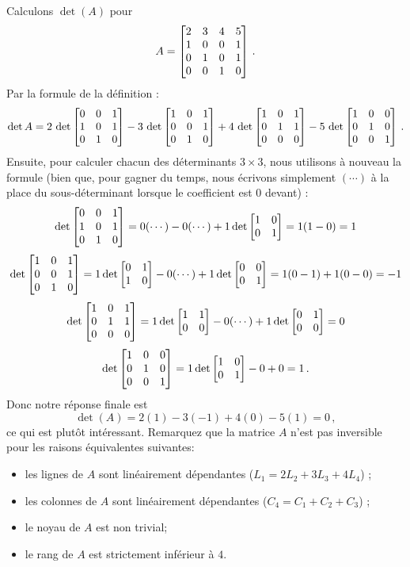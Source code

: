 \begin{myexample}
Calculons $\det(A)$ pour
$$
A= \left[ \begin{matrix} 
2 & 3 & 4 & 5 \\ 
1 & 0 & 0 & 1\\ 
0 & 1 & 0 & 1\\ 
0 & 0 & 1 & 0 \end{matrix} \right]\,.
$$
Par la formule de la définition :
$$
\det A = 2\,\det\left[ \begin{matrix} 0&0&1\\ 1&0&1\\ 0&1&0 \end{matrix} \right] - 3\,\det\left[ \begin{matrix} 1&0&1\\0&0&1\\0&1&0 \end{matrix} \right] +
4\,\det\left[ \begin{matrix} 1&0&1\\ 0&1&1\\ 0&0&0 \end{matrix} \right] - 5\,\det\left[ \begin{matrix} 1&0&0\\0&1&0\\0&0&1 \end{matrix} \right]\,.
$$
Ensuite, pour calculer chacun des d\'eterminants $3\times 3$, nous utilisons à nouveau la formule (bien que,
pour gagner du temps, nous écrivons simplement $(\cdots)$ à la place du sous-déterminant lorsque
le coefficient est $0$ devant) :
$$
\det\left[ \begin{matrix} 0&0&1\\ 1&0&1\\ 0&1&0 \end{matrix} \right] = 0 (\cdots) - 0(\cdots) + 1\det\left[ \begin{matrix} 1&0\\0&1 \end{matrix} \right] = 1(1-0) = 1
$$
$$
\det\left[ \begin{matrix} 1&0&1\\0&0&1\\0&1&0 \end{matrix} \right] = 1\det\left[ \begin{matrix} 0&1\\1&0 \end{matrix} \right] - 0 (\cdots) + 1\det\left[ \begin{matrix} 0&0\\0&1 \end{matrix} \right] = 1(0-1) + 1(0-0) = -1
$$
$$
\det\left[ \begin{matrix} 1&0&1\\ 0&1&1\\ 0&0&0 \end{matrix} \right] = 1\det\left[ \begin{matrix} 1&1\\0&0 \end{matrix} \right] -0 (\cdots) + 1\det\left[ \begin{matrix} 0&1\\0&0 \end{matrix} \right] = 0
$$
$$
\det\left[ \begin{matrix} 1&0&0\\0&1&0\\0&0&1 \end{matrix} \right] = 1\det\left[ \begin{matrix} 1&0\\0&1 \end{matrix} \right] - 0 + 0 = 1\,.
$$
Donc notre r\'eponse finale est
$$
\det(A) = 2(1)-3(-1) + 4(0) - 5(1) = 0\,,
$$
ce qui est plutôt intéressant.  Remarquez que la matrice $A$ n'est pas
inversible pour les raisons \'equivalentes suivantes: 
\begin{itemize}
	\item les lignes de $A$ sont linéairement dépendantes ($L_1=2L_2+3L_3+4L_4$) ; 
	\item les colonnes de $A$ sont linéairement dépendantes
 ($C_4=C_1+C_2+C_3$) ; 
 	\item le noyau de $A$ est non trivial; 
	\item le rang de $A$ est strictement inférieur à $4$.
\end{itemize}
\end{myexample}

